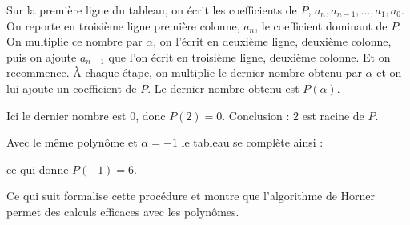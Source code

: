 \documentclass[class=report,crop=false]{standalone}
\begin{document}
Sur la première ligne du tableau, on écrit les coefficients de $P$, $a_n,a_{n-1},\ldots,a_1,a_0$.
On reporte en troisième ligne première colonne, $a_n$, le coefficient dominant de $P$.
On multiplie ce nombre par $\alpha$, on l'écrit en deuxième ligne, deuxième colonne, 
puis on ajoute $a_{n-1}$ que l'on écrit en troisième ligne, deuxième colonne.
Et on recommence. À chaque étape, on multiplie le dernier nombre obtenu par $\alpha$ et on lui ajoute un coefficient de $P$. 
Le dernier nombre obtenu est $P(\alpha)$.


Ici le dernier nombre est $0$, donc $P(2)=0$. Conclusion : $2$ est racine de $P$.


Avec le même polynôme et $\alpha=-1$ le tableau se complète ainsi :

ce qui donne $P(-1)=6$.

Ce qui suit formalise cette procédure et montre que l'algorithme de Horner permet des calculs efficaces avec les polynômes.
\end{document}
